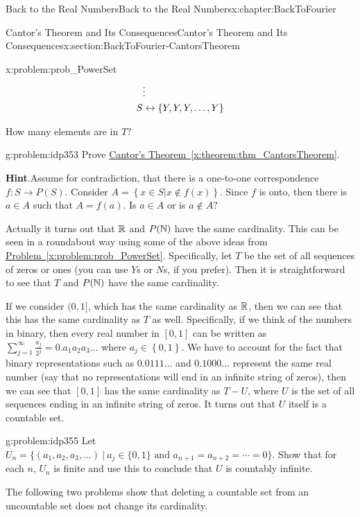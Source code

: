 \begin{chapterptx}{Back to the Real Numbers}{}{Back to the Real Numbers}{}{}{x:chapter:BackToFourier}
\begin{sectionptx}{Cantor's Theorem and Its Consequences}{}{Cantor's Theorem and Its Consequences}{}{}{x:section:BackToFourier-CantorsTheorem}
\begin{problem}{}{x:problem:prob_PowerSet}
\begin{align*}
				& \vdots\\
				S& \leftrightarrow \{Y,Y,Y,\ldots,Y\}
			\end{align*}
			\par
			How many elements are in \(T?\)%
		\end{problem}
		\begin{problem}{}{g:problem:idp353}%
			Prove \hyperref[x:theorem:thm_CantorsTheorem]{Cantor's Theorem~{\xreffont\ref{x:theorem:thm_CantorsTheorem}}}.%
			\par\smallskip%
			\noindent\textbf{\blocktitlefont Hint}.\hypertarget{g:hint:idp354}{}\quad{}Assume for contradiction, that there is a one-to-one correspondence \(f:S\rightarrow P(S)\). Consider \(A=\left\{x\in S|x\not\in f(x)\right\}\). Since \(f\) is onto, then there is \(a\in A\) such that \(A=f(a)\).  Is \(a\in A\) or is \(a\not\in
			A?\)%
		\end{problem}
		Actually it turns out that \(\mathbb {R}\) and \(P(\mathbb {N})\) have the same cardinality. This can be seen in a roundabout way using some of the above ideas from \hyperref[x:problem:prob_PowerSet]{Problem~{\xreffont\ref{x:problem:prob_PowerSet}}}. Specifically, let \(T\) be the set of all sequences of zeros or ones (you can use \(Y\)s or \(N\)s, if you prefer). Then it is straightforward to see that \(T\) and \(P(\mathbb {N})\) have the same cardinality.%
		\par
		If we consider \((0,1]\), which has the same cardinality as \(\mathbb {R}\), then we can see that this has the same cardinality as \(T\) as well. Specifically, if we think of the numbers in binary, then every real number in \([0,1]\) can be written as \(\sum_{j=1}^\infty \frac{a_j}{2^j} =0.a_1a_2a_3\ldots\) where \(a_j\in\left\{0,1\right\}\). We have to account for the fact that binary representations such as \(0.0111\ldots\) and \(0.1000\ldots\) represent the same real number (say that no representations will end in an infinite string of zeros), then we can see that \([0,1]\) has the same cardinality as \(T-U\), where \(U\) is the set of all sequences ending in an infinite string of zeros. It turns out that \(U\) itself is a countable set.%
		\begin{problem}{}{g:problem:idp355}%
			 Let \(U_n=\{(a_1,a_2,a_3,\ldots)\ |\ a_j\in \{0,1\} \text{ and } a_{n+1}=a_{n+2}=\cdots=0\}\). Show that for each \(n\), \(U_n\) is finite and use this to conclude that \(U\) is countably infinite.%
		\end{problem}
		The following two problems show that deleting a countable set from an uncountable set does not change its cardinality.%

\end{sectionptx}
\end{chapterptx}
